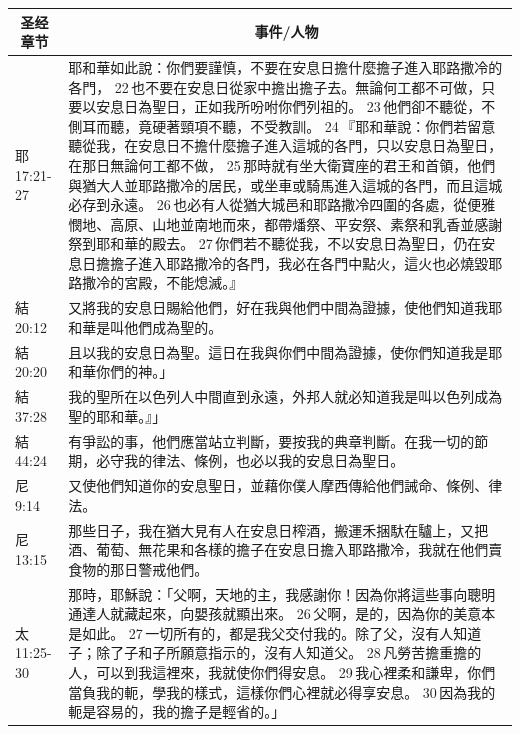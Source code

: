 \begin{table}[H]
\centering
\begin{tabular}{p{2cm}|p{14.5cm}}\hline\hline
\multicolumn{1}{c|}{圣经章节}&\multicolumn{1}{c}{事件/人物}\\\hline
耶 17:21-27&耶和華如此說：你們要謹慎，不要在安息日擔什麼擔子進入耶路撒冷的各門， 22 也不要在安息日從家中擔出擔子去。無論何工都不可做，只要以安息日為聖日，正如我所吩咐你們列祖的。 23 他們卻不聽從，不側耳而聽，竟硬著頸項不聽，不受教訓。
24 『耶和華說：你們若留意聽從我，在安息日不擔什麼擔子進入這城的各門，只以安息日為聖日，在那日無論何工都不做， 25 那時就有坐大衛寶座的君王和首領，他們與猶大人並耶路撒冷的居民，或坐車或騎馬進入這城的各門，而且這城必存到永遠。 26 也必有人從猶大城邑和耶路撒冷四圍的各處，從便雅憫地、高原、山地並南地而來，都帶燔祭、平安祭、素祭和乳香並感謝祭到耶和華的殿去。 27 你們若不聽從我，不以安息日為聖日，仍在安息日擔擔子進入耶路撒冷的各門，我必在各門中點火，這火也必燒毀耶路撒冷的宮殿，不能熄滅。』\\\hline

結 20:12&
又將我的安息日賜給他們，好在我與他們中間為證據，使他們知道我耶和華是叫他們成為聖的。\\\hline

結 20:20&
且以我的安息日為聖。這日在我與你們中間為證據，使你們知道我是耶和華你們的神。」\\\hline

結 37:28&
我的聖所在以色列人中間直到永遠，外邦人就必知道我是叫以色列成為聖的耶和華。』」\\\hline

結 44:24&
有爭訟的事，他們應當站立判斷，要按我的典章判斷。在我一切的節期，必守我的律法、條例，也必以我的安息日為聖日。\\\hline


尼 9:14&
又使他們知道你的安息聖日，並藉你僕人摩西傳給他們誡命、條例、律法。\\\hline

尼 13:15&
那些日子，我在猶大見有人在安息日榨酒，搬運禾捆馱在驢上，又把酒、葡萄、無花果和各樣的擔子在安息日擔入耶路撒冷，我就在他們賣食物的那日警戒他們。\\\hline


太11:25-30&那時，耶穌說：「父啊，天地的主，我感謝你！因為你將這些事向聰明通達人就藏起來，向嬰孩就顯出來。 26 父啊，是的，因為你的美意本是如此。 27 一切所有的，都是我父交付我的。除了父，沒有人知道子；除了子和子所願意指示的，沒有人知道父。 28 凡勞苦擔重擔的人，可以到我這裡來，我就使你們得安息。 29 我心裡柔和謙卑，你們當負我的軛，學我的樣式，這樣你們心裡就必得享安息。 30 因為我的軛是容易的，我的擔子是輕省的。」\\\hline



\end{tabular}
\end{table}
